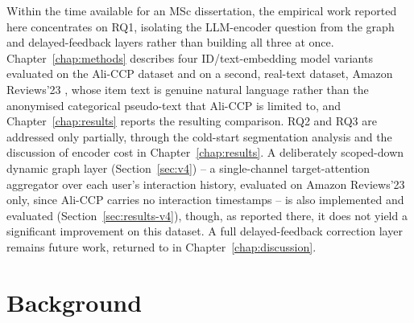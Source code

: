 \documentclass{uclthesis}
\begin{document}
Within the time available for an MSc dissertation, the empirical work reported here concentrates on RQ1, isolating the LLM-encoder question from the graph and delayed-feedback layers rather than building all three at once. Chapter~\ref{chap:methods} describes four ID/text-embedding model variants evaluated on the Ali-CCP dataset and on a second, real-text dataset, Amazon Reviews'23 \citep{hou2024bridging}, whose item text is genuine natural language rather than the anonymised categorical pseudo-text that Ali-CCP is limited to, and Chapter~\ref{chap:results} reports the resulting comparison. RQ2 and RQ3 are addressed only partially, through the cold-start segmentation analysis and the discussion of encoder cost in Chapter~\ref{chap:results}. A deliberately scoped-down dynamic graph layer (Section~\ref{sec:v4}) -- a single-channel target-attention aggregator over each user's interaction history, evaluated on Amazon Reviews'23 only, since Ali-CCP carries no interaction timestamps -- is also implemented and evaluated (Section~\ref{sec:results-v4}), though, as reported there, it does not yield a significant improvement on this dataset. A full delayed-feedback correction layer remains future work, returned to in Chapter~\ref{chap:discussion}.
\chapter{Background}
\label{chap:background}
\end{document}
